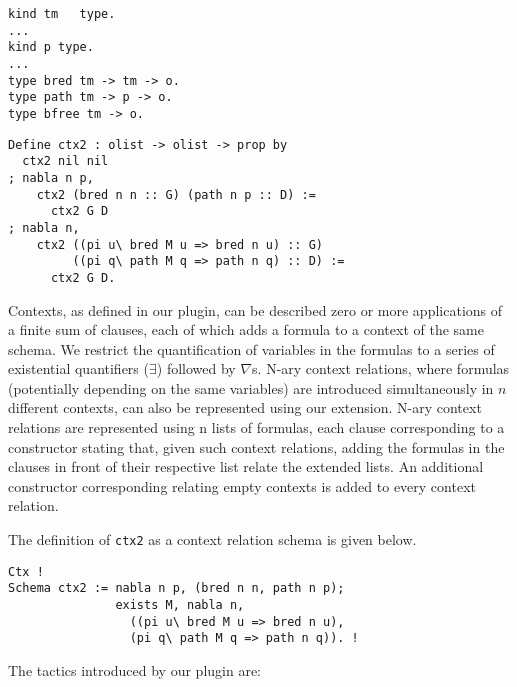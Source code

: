\documentclass[nocopyrightspace,authoryear]{sigplanconf}
\begin{document}
\begin{lstlisting}
kind tm   type.
...
kind p type.
...
type bred tm -> tm -> o.
type path tm -> p -> o.
type bfree tm -> o.
\end{lstlisting}
\begin{lstlisting}
Define ctx2 : olist -> olist -> prop by
  ctx2 nil nil
; nabla n p,
    ctx2 (bred n n :: G) (path n p :: D) := 
      ctx2 G D
; nabla n,
    ctx2 ((pi u\ bred M u => bred n u) :: G)
         ((pi q\ path M q => path n q) :: D) :=
      ctx2 G D.
\end{lstlisting}

Contexts, as defined in our plugin, can be described zero or more applications of a finite sum of clauses, each of which adds a formula to a context of the same schema. We restrict the quantification of variables in the formulas to a series of existential quantifiers ($\exists$) followed by $\nabla$s. N-ary context relations, where formulas (potentially depending on the same variables) are introduced simultaneously in  $n$ different contexts, can also be represented using our extension. N-ary context relations are represented using n lists of formulas, each clause corresponding to a constructor stating that, given such context relations, adding the formulas in the clauses in front of their respective list relate the extended lists. An additional constructor corresponding relating empty contexts is added to every context relation. 

\begin{comment}
\begin{lstlisting}
cbody :=
  | term, cbody
  | term

clause :=
  | ["exists" ...,]? ["nabla" ...,]? ( cbody )
  | ["exists" ...,]? ["nabla" ...,]? term

top_command :=
  | "Schema" id := clause
\end{lstlisting} 
\end{comment}

The definition of \lstinline|ctx2| as a context relation schema is given below.

\begin{lstlisting}
Ctx !
Schema ctx2 := nabla n p, (bred n n, path n p);
               exists M, nabla n, 
                 ((pi u\ bred M u => bred n u), 
                 (pi q\ path M q => path n q)). !
\end{lstlisting}


The tactics introduced by our plugin are:
\end{document}
